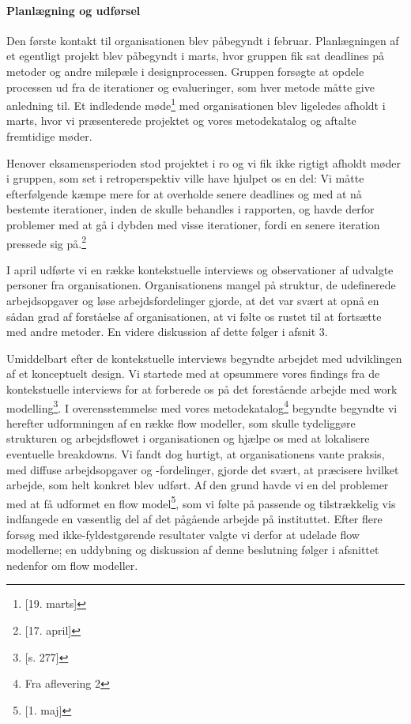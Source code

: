 \paragraph{Planlægning og udførsel}
Den første kontakt til organisationen blev påbegyndt i februar. Planlægningen af et egentligt projekt blev påbegyndt i marts, hvor gruppen fik sat deadlines på metoder og andre milepæle i designprocessen. Gruppen forsøgte at opdele processen ud fra de iterationer og evalueringer, som hver metode måtte give anledning til. Et indledende møde\footnote{\citep{Dagbog}[19. marts]} med organisationen blev ligeledes afholdt i marts, hvor vi præsenterede projektet og vores metodekatalog og aftalte fremtidige møder.

Henover eksamensperioden stod projektet i ro og vi fik ikke rigtigt afholdt møder i gruppen, som set i retroperspektiv ville have hjulpet os en del: Vi måtte efterfølgende kæmpe mere for at overholde senere deadlines og med at nå bestemte iterationer, inden de skulle behandles i rapporten, og havde derfor problemer med at gå i dybden med visse iterationer, fordi en senere iteration pressede sig på.\footnote{\citep{Dagbog}[17. april]}

I april udførte vi en række kontekstuelle interviews og observationer af udvalgte personer fra organisationen. Organisationens mangel på struktur, de udefinerede arbejdsopgaver og  løse arbejdsfordelinger gjorde, at det var svært at opnå en sådan grad af forståelse af organisationen, at vi følte os rustet til at fortsætte med andre metoder. En videre diskussion af dette følger i afsnit 3.

Umiddelbart efter de kontekstuelle interviews begyndte arbejdet med udviklingen af et konceptuelt design. Vi startede med at opsummere vores findings fra de kontekstuelle interviews for at forberede os på det forestående arbejde med work modelling\footnote{\citep{Benyon}[s. 277]}.
I overensstemmelse med vores metodekatalog\footnote{Fra aflevering 2} begyndte begyndte vi herefter udformningen af en række flow modeller, som skulle tydeliggøre strukturen og arbejdsflowet i organisationen og hjælpe os med at lokalisere eventuelle breakdowns. 
Vi fandt dog hurtigt, at organisationens vante praksis, med diffuse arbejdsopgaver og -fordelinger, gjorde det svært, at præcisere hvilket arbejde, som helt konkret blev udført. Af den grund havde vi en del problemer med at få udformet en flow model\footnote{\citep{Dagbog}[1. maj]}, som vi følte på passende og tilstrækkelig vis indfangede en væsentlig del af det pågående arbejde på instituttet. Efter flere forsøg med ikke-fyldestgørende resultater valgte vi derfor at udelade flow modellerne; en uddybning og diskussion af denne beslutning følger i afsnittet nedenfor om flow modeller.

